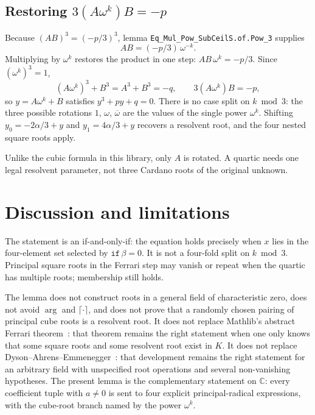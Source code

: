 \documentclass[11pt,a4paper]{article}
\newcommand{\C}{\mathbb{C}}
\newcommand{\Arg}{\operatorname{arg}}
\begin{document}
\subsection{Restoring \texorpdfstring{$3(A\omega^{k})B=-p$}{3(A omega k)B=-p}}
\label{sec:product}

Because \((AB)^3=(-p/3)^3\), lemma \texttt{Eq\_Mul\_Pow\_SubCeilS.of.Pow\_3} supplies
\[
AB=(-p/3)\,\omega^{-k}.
\]
Multiplying by \(\omega^{k}\) restores the product in one step: \(AB\,\omega^{k}=-p/3\).
Since \((\omega^{k})^3=1\),
\[
(A\omega^{k})^3+B^3=A^3+B^3=-q,\qquad 3(A\omega^{k})B=-p,
\]
so \(y=A\omega^{k}+B\) satisfies \(y^3+py+q=0\).
There is no case split on \(k\bmod 3\): the three possible rotations \(1\), \(\omega\), \(\overline{\omega}\) are the values of the single power \(\omega^{k}\).
Shifting \(y_0=-2\alpha/3+y\) and \(y_1=4\alpha/3+y\) recovers a resolvent root, and the four nested square roots apply.

Unlike the cubic formula in this library, only \(A\) is rotated.
A quartic needs one legal resolvent parameter, not three Cardano roots of the original unknown.

\section{Discussion and limitations}
\label{sec:discussion}

The statement is an if-and-only-if: the equation holds precisely when \(x\) lies in the four-element set selected by \(\mathtt{if}\,\beta=0\).
It is not a four-fold split on \(k\bmod 3\).
Principal square roots in the Ferrari step may vanish or repeat when the quartic has multiple roots; membership still holds.

The lemma does not construct roots in a general field of characteristic zero, does not avoid \(\Arg\) and \(\lceil\cdot\rceil\), and does not prove that a randomly chosen pairing of principal cube roots is a resolvent root.
It does not replace Mathlib's abstract Ferrari theorem~\cite{zhu2024mathlibquartic}: that theorem remains the right statement when one only knows that some square roots and some resolvent root exist in \(K\).
It does not replace Dyson--Ahrens--Emmenegger~\cite{dyson2022polynomials}: that development remains the right statement for an arbitrary field with unspecified root operations and several non-vanishing hypotheses.
The present lemma is the complementary statement on \(\C\): every coefficient tuple with \(a\neq 0\) is sent to four explicit principal-radical expressions, with the cube-root branch named by the power \(\omega^{k}\).
\end{document}
